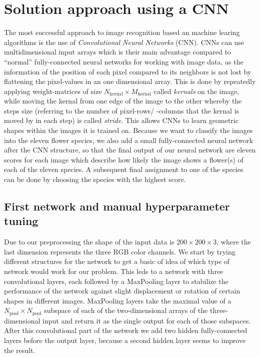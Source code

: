\section{Solution approach using a CNN}
\label{sec:ansatz}
The most successful approach to image recognition based an machine learing algorithms is the use of \textit{Convolutional Neural Networks} (CNN).
CNNs can use multidimensional input arrays which is their main advantage compared to \enquote{normal} fully-connected neural networks for working with image data, 
as the information of the position of each pixel compared to its neighbors is not lost by flattening the pixel-values in an one dimensional array.
This is done by repeatedly applying weight-matrices of size $N_\text{kernal}\times M_\text{kernal}$ called \textit{kernals} on the image, while moving the kernal from one edge of the image to the other 
whereby the steps size (referring to the number of pixel-rows/ -columns that the kernal is moved by in each step) is called \textit{stride}.
This allows CNNs to learn geometric shapes within the images it is trained on.
Because we want to classify the images into the eleven flower species, we also add a small fully-connected neural network after the CNN structure, so that the final output of our
neural network are eleven scores for each image which describe how likely the image shows a flower(s) of each of the eleven species.
A subsequent final assignment to one of the species can be done by choosing the species with the highest score.


\subsection{First network and manual hyperparameter tuning}
Due to our preprocessing the shape of the input data is $200\times 200\times 3$, where the last dimension represents the three RGB color channels. 
We start by trying different structures for the network to get a basic of idea of which type of network would work for our problem.
This leds to a network with three convolutional layers, each followed by a MaxPooling layer to stabilize the performance of the network against slight displacement or rotation of certain shapes 
in different images. %
MaxPooling layers take the maximal value of a $N_\text{pool}\times N_\text{pool}$ subspace of each of the two-dimensional arrays of the three-dimensional input and return it as the single output 
for each of those subspaces.
After this convolutional part of the network we add two hidden fully-connected layers before the output layer, because a second hidden layer seems to improve the result.

